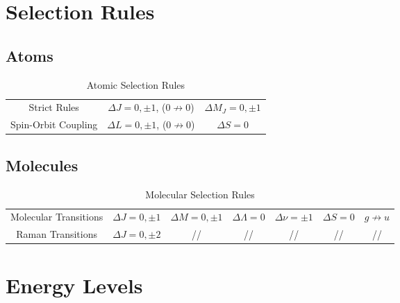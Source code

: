 \documentclass[../qm.tex]{subfiles}
\begin{document}
\section{Selection Rules}
\subsection{Atoms}
\begin{table}[H]
	\centering
	\begin{tabular}{c|c|c|}
		\hline
		Strict Rules&$\Delta J=0,\pm1$, ($0\not\to0$)&$\Delta M_J=0,\pm1$\\
		Spin-Orbit Coupling&$\Delta L=0,\pm1$, ($0\not\to0$)&$\Delta S=0$\\
		\hline
	\end{tabular}
	\caption{Atomic Selection Rules}
	\label{tab:selrules}
\end{table}
\subsection{Molecules}
\begin{table}[H]
	\centering
	\begin{tabular}{c|c|c|c|c|c|c|}
		\hline
		Molecular Transitions&$\Delta J=0,\pm1$&$\Delta M=0,\pm1$&$\Delta\Lambda=0$&$\Delta\nu=\pm1$&$\Delta S=0$&$g\not\to u$\\
		Raman Transitions&$\Delta J=0,\pm 2$&//&//&//&//&//\\
		\hline
	\end{tabular}
	\caption{Molecular Selection Rules}
	\label{tab:molselrules}
\end{table}
\section{Energy Levels}
\end{document}
